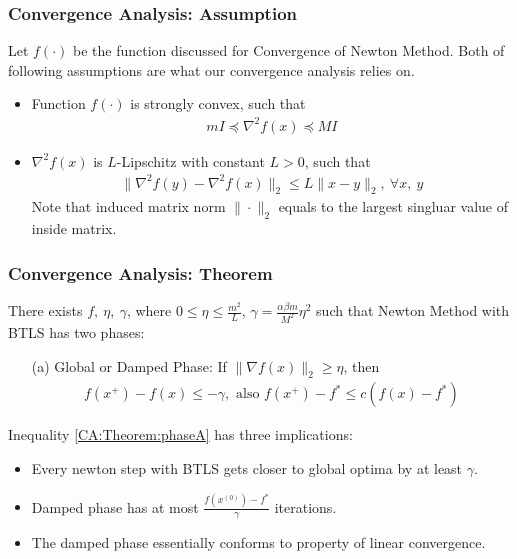 \documentclass{beamer}
\begin{document}
\begin{frame}
    \frametitle{Convergence Analysis: Assumption}    
        Let $f(\cdot)$ be the function discussed for Convergence of Newton
        Method. Both of following assumptions are what our convergence
        analysis relies on.
        \begin{itemize}
            \item Function $f(\cdot)$ is strongly convex, such that
    \begin{align}
        m I \preceq \nabla^2 f(x) \preceq M I
    \end{align}
\item $\nabla^2 f(x)$ is $L$-Lipschitz with constant $L > 0$, such that
    \begin{align}
        \| \nabla^2_{}f(y)  - \nabla^2_{}f(x) \|_2 \leq L \|x-y\|_2,\ 
        \forall x,\ y
    \end{align}
        Note that induced matrix norm $\| \cdot \|_2$ equals to the largest
        singluar value of inside matrix.
        \end{itemize}
\end{frame}

\begin{frame}
    \frametitle{Convergence Analysis: Theorem}    
    \begin{theorem}[Part I]
        There exists $f,\ \eta,\ \gamma$, where $ 0 \leq \eta \leq \frac{m^2}{L}$,
        $\gamma = \frac{\alpha \beta m}{M^2}\eta^2$
        such that Newton Method with BTLS has two phases: 
        \begin{itemize}
            \item[(a)] Global or Damped Phase: If $\|\nabla f(x)\|_2 \geq \eta$, then 
                \begin{align}
                    f(x^{+}) - f(x) \leq -\gamma, \text{ also } 
                    f(x^{+}) - f^* \leq c(f(x)-f^*) \label{CA:Theorem:phaseA}
                \end{align}
        \end{itemize}
    \end{theorem}
        Inequality \eqref{CA:Theorem:phaseA} has three implications: 
        \begin{itemize}
            \item Every newton step with BTLS gets closer to global optima by
                at least $\gamma$.
            \item Damped phase has at most $\frac{f(x^{(0)}) -
                    f^{*}}{\gamma}$ iterations.
            \item The damped phase essentially conforms to property of linear convergence.
        \end{itemize}
\end{frame}
\end{document}
